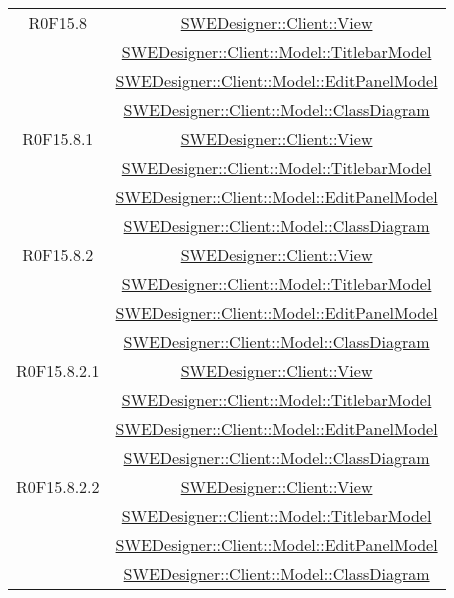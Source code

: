 \documentclass[../SpecificaTecnica.tex]{subfiles}
\begin{document}
\begin{longtable}{|c|c|}
		R0F15.8 & \hyperlink{SWEDesigner::Client::View}{SWEDesigner::Client::View}\\& \hyperlink{SWEDesigner::Client::Model::TitlebarModel}{SWEDesigner::Client::Model::TitlebarModel}\\& \hyperlink{SWEDesigner::Client::Model::EditPanelModel}{SWEDesigner::Client::Model::EditPanelModel}\\& \hyperlink{SWEDesigner::Client::Model::ClassDiagram}{SWEDesigner::Client::Model::ClassDiagram}\\\hline
		R0F15.8.1 & \hyperlink{SWEDesigner::Client::View}{SWEDesigner::Client::View}\\& \hyperlink{SWEDesigner::Client::Model::TitlebarModel}{SWEDesigner::Client::Model::TitlebarModel}\\& \hyperlink{SWEDesigner::Client::Model::EditPanelModel}{SWEDesigner::Client::Model::EditPanelModel}\\& \hyperlink{SWEDesigner::Client::Model::ClassDiagram}{SWEDesigner::Client::Model::ClassDiagram}\\\hline
		R0F15.8.2 & \hyperlink{SWEDesigner::Client::View}{SWEDesigner::Client::View}\\& \hyperlink{SWEDesigner::Client::Model::TitlebarModel}{SWEDesigner::Client::Model::TitlebarModel}\\& \hyperlink{SWEDesigner::Client::Model::EditPanelModel}{SWEDesigner::Client::Model::EditPanelModel}\\& \hyperlink{SWEDesigner::Client::Model::ClassDiagram}{SWEDesigner::Client::Model::ClassDiagram}\\\hline
		R0F15.8.2.1 & \hyperlink{SWEDesigner::Client::View}{SWEDesigner::Client::View}\\& \hyperlink{SWEDesigner::Client::Model::TitlebarModel}{SWEDesigner::Client::Model::TitlebarModel}\\& \hyperlink{SWEDesigner::Client::Model::EditPanelModel}{SWEDesigner::Client::Model::EditPanelModel}\\& \hyperlink{SWEDesigner::Client::Model::ClassDiagram}{SWEDesigner::Client::Model::ClassDiagram}\\\hline
		R0F15.8.2.2 & \hyperlink{SWEDesigner::Client::View}{SWEDesigner::Client::View}\\& \hyperlink{SWEDesigner::Client::Model::TitlebarModel}{SWEDesigner::Client::Model::TitlebarModel}\\& \hyperlink{SWEDesigner::Client::Model::EditPanelModel}{SWEDesigner::Client::Model::EditPanelModel}\\& \hyperlink{SWEDesigner::Client::Model::ClassDiagram}{SWEDesigner::Client::Model::ClassDiagram}\\\hline

\end{longtable}
\end{document}
